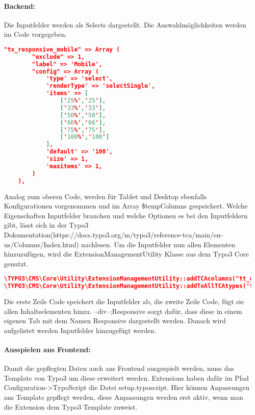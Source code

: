 \paragraph{Backend:} Die Inputfelder werden als Selects dargestellt. Die Auswahlmöglichkeiten werden im Code vorgegeben.
\begin{lstlisting}[language=json,firstnumber=1]
"tx_responsive_mobile" => Array (
        "exclude" => 1,
        "label" => 'Mobile',
        "config" => Array (
            'type' => 'select',
            'renderType' => 'selectSingle',
            'items' => [
                ['25%','25'],
                ['33%','33'],
                ['50%','50'],
                ['66%','66'],
                ['75%','75'],
                ['100%','100']
            ],
            'default' => '100',
            'size' => 1,
            'maxitems' => 1,
        )
    ),
\end{lstlisting}
Analog zum oberen Code, werden für Tablet und Desktop ebenfalls Konfigurationen vorgenommen und im Array \$tempColumns gespeichert. Welche Eigenschaften Inputfelder brauchen und welche Optionen es bei den Inputfeldern gibt, lässt sich in der Typo3 Dokumentation(https://docs.typo3.org/m/typo3/\newline reference-tca/main/en-us/Columns/Index.html) nachlesen. Um die Inputfelder nun allen Elementen hinzuzufügen, wird die ExtensionManagementUtility Klasse aus dem Typo3 Core genutzt.
\begin{lstlisting}[language=json,firstnumber=1]
\TYPO3\CMS\Core\Utility\ExtensionManagementUtility::addTCAcolumns("tt_content",$tempColumns,1);
\TYPO3\CMS\Core\Utility\ExtensionManagementUtility::addToAllTCAtypes('tt_content','--div--;Responsive,tx_responsive_mobile,tx_responsive_tablet,tx_responsive_desktop','','after:addToAllTCAtypes');
\end{lstlisting}

Die erste Zeile Code speichert die Inputfelder ab, die zweite Zeile Code, fügt sie allen Inhaltselementen hinzu. --div--;Responsive sorgt dafür, dass diese in einem eigenen Tab mit dem Namen Responsive dargestellt werden. Danach wird aufgelistet werden Inputfelder hinzugefügt werden.

\paragraph{Ausspielen ans Frontend:}

Damit die gepflegten Daten auch ans Frontend ausgespielt werden, muss das Template von Typo3 um diese erweitert werden. Extensions haben dafür im Pfad \newline Configuration->TypoScript die Datei setup.typoscript. Hier können Anpassungen ans Template gepflegt werden, diese Anpassungen werden erst aktiv, wenn man die Extension dem Typo3 Template zuweist.

